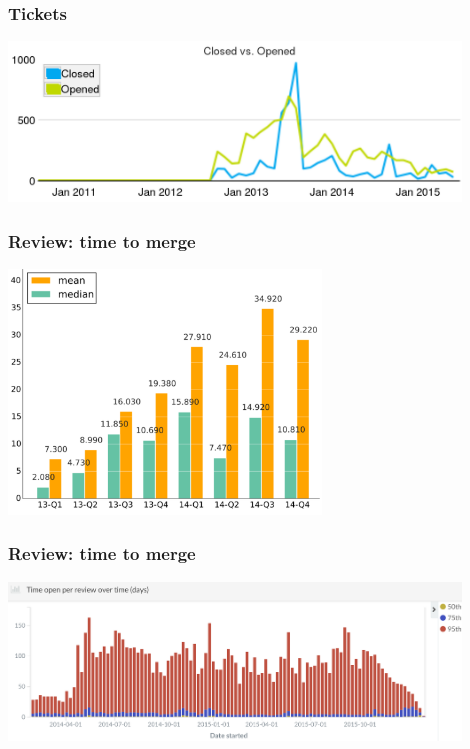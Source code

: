 \documentclass[17pt,aspectratio=169,hyperref=pdfusetitle]{beamer}
\begin{document}

\begin{frame}
\frametitle{Tickets}

\begin{center}
  \includegraphics[width=12cm]{figs/processes-tickets-closed-open}
\end{center}

\end{frame}


\begin{frame}
\frametitle{Review: time to merge}

\begin{center}
  \includegraphics[height=6.5cm]{figs/processes-crs-nova-time-to-merge}
\end{center}

\end{frame}


\begin{frame}
\frametitle{Review: time to merge}

\begin{center}
  \includegraphics[width=12cm]{figs/timeopen-review}
\end{center}

\end{frame}
\end{document}
